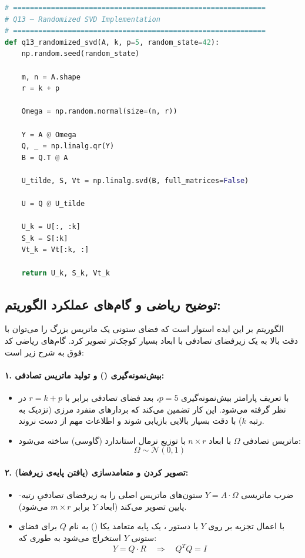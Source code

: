 \documentclass{article}
\begin{document}
\begin{latin}
\begin{lstlisting}[language=Python]
# ============================================================
# Q13 — Randomized SVD Implementation
# ============================================================
def q13_randomized_svd(A, k, p=5, random_state=42):
    np.random.seed(random_state)
        
    m, n = A.shape
    r = k + p
        
    Omega = np.random.normal(size=(n, r))
    
    Y = A @ Omega
    Q, _ = np.linalg.qr(Y)    
    B = Q.T @ A
    
    U_tilde, S, Vt = np.linalg.svd(B, full_matrices=False)
    
    U = Q @ U_tilde
    
    U_k = U[:, :k]
    S_k = S[:k]
    Vt_k = Vt[:k, :]
    
    return U_k, S_k, Vt_k
\end{lstlisting}
\end{latin}

    \subsection*{توضیح ریاضی و گام‌های عملکرد الگوریتم:}

    الگوریتم  بر این ایده استوار است که فضای ستونی یک ماتریس بزرگ را می‌توان با دقت بالا به یک زیرفضای تصادفی با ابعاد بسیار کوچک‌تر تصویر کرد. گام‌های ریاضی کد فوق به شرح زیر است:

    \paragraph{۱. بیش‌نمونه‌گیری () و تولید ماتریس تصادفی:}
    \begin{itemize}
        \item با تعریف پارامتر بیش‌نمونه‌گیری $p=5$، بعد فضای تصادفی برابر با $r = k + p$ در نظر گرفته می‌شود. این کار تضمین می‌کند که بردارهای منفرد مرزی (نزدیک به رتبه $k$) با دقت بسیار بالایی بازیابی شوند و اطلاعات مهم از دست نروند.
        \item ماتریس تصادفی $\Omega$ با ابعاد $n \times r$ با توزیع نرمال استاندارد (گاوسی) ساخته می‌شود:
        $$\Omega \sim \mathcal{N}(0, 1)$$
    \end{itemize}

    \paragraph{۲. تصویر کردن و متعامدسازی (یافتن پایه‌ی زیرفضا):}
    \begin{itemize}
        \item ضرب ماتریسی $Y = A \cdot \Omega$ ستون‌های ماتریس اصلی را به زیرفضای تصادفیِ رتبه-پایین تصویر می‌کند (ابعاد $Y$ برابر $m \times r$ می‌شود).
        \item با اعمال تجزیه  بر روی $Y$ با دستور ، یک پایه متعامد یکا () به نام $Q$ برای فضای ستونی $Y$ استخراج می‌شود به طوری که:
        $$Y = Q \cdot R \quad \Rightarrow \quad Q^T Q = I$$
    \end{itemize}
\end{document}
